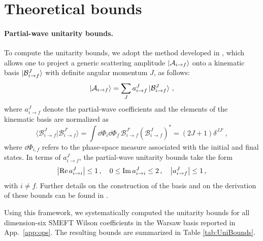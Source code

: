 \documentclass[
aps,
prd,
10pt,
twocolumn,
oneside,
preprintnumbers,
superscriptaddress,
amsmath,
amssymb,
nofootinbib,
flushbottom]{revtex4-2}
\begin{document}
\section{Theoretical bounds\label{sec:bounds}}

\paragraph{Partial-wave unitarity bounds.}
%
To compute the unitarity bounds, we adopt the method developed in \cite{Bresciani:2025toe}, which allows one to project a generic scattering amplitude $\ket{\mathcal{A}_{i\to f}}$ onto a kinematic basis $\ket{\mathcal{B}^J_{i\to f}}$ with definite angular momentum $J$, as follows:
\begin{equation}
\ket{\mathcal{A}_{i\to f}}=\sum_J a_{i\to f}^J \ket{\mathcal{B}_{i\to f}^J}\,,
\end{equation}
where $a_{i\to f}^J$ denote the partial-wave coefficients and the elements of the kinematic basis are normalized as 
\begin{equation}
    \langle \mathcal B^J_{i\to f}|\mathcal B^{J'}_{i\to f}\rangle = \int \dd\Phi_i \dd\Phi_f \, \mathcal B^{J'}_{i\to f} \left(\mathcal B^J_{i\to f}\right)^* = (2J+1)\delta^{JJ'}\,,
\end{equation}
where $\dd\Phi_{i,f}$ refers to the phase-space measure associated with the initial and final states.
In terms of $a_{i\to f}^J$, the partial-wave unitarity bounds 
take the form
%
\begin{equation}\label{unitarity bound general}
\abs{\Re a_{i\to i}^J}\leq 1\,,
\quad
0\leq \Im a_{i\to i}^J\leq 2\,,
\quad
\abs{a_{i\to f}^J}\leq 1\,,
\end{equation}
with $i \neq f$.
Further details on the construction of the basis and on the derivation of these bounds can be found in \cite{Bresciani:2025toe,Bresciani:2025ojh,Jiang:2020rwz,Shu:2021qlr}.

Using this framework, we systematically computed the unitarity bounds 
for all dimension-six SMEFT Wilson coefficients in the Warsaw basis \cite{Grzadkowski:2010es} reported in App.~\ref{app:ops}. 
The resulting bounds are summarized in Table \ref{tab:UniBounds}.
\end{document}
